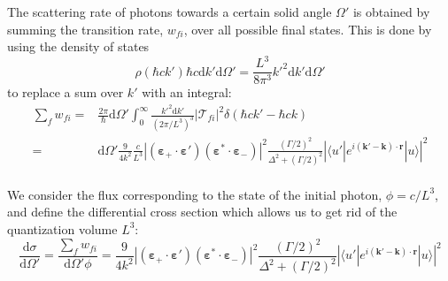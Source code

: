 \documentclass[11pt,letter]{article}
\newcommand{\bv}[1]{\ensuremath{\bm{#1}}}
\begin{document}
The scattering rate of photons towards a certain solid angle $\Omega'$ is
obtained by summing the transition rate, $w_{fi}$, over all possible final
states.    This is done by using the density of states  
\begin{equation}
    \rho( \hbar c k') \hbar c \mathrm{d} k' \mathrm{d} \Omega ' 
  = \frac{L^{3}}{8 \pi^{3} }  k'^{2} \mathrm{d} k' \mathrm{d} \Omega' 
\end{equation}
to replace a sum over $k'$ with an integral:  
\begin{equation}
\begin{split}
  \sum_{f} w_{fi} = & 
   \frac{2\pi}{\hbar}  \mathrm{d} \Omega' 
      \int_{0}^{\infty} \frac{k'^{2} \mathrm{d} k' }{ (2\pi / L^{3} ) ^{3} } 
   | \mathcal{T}_{fi} |^{2} 
   \delta( \hbar c k' - \hbar c k )  \\ 
   = & 
   \mathrm{d} \Omega' \frac{9}{4 k^{2}} \frac{ c } {L^{3} }
        |(\bv{\varepsilon}_{+}\cdot \bv{\varepsilon}' )
                       (\bv{\varepsilon}^{*}\cdot \bv{\varepsilon}_{-} ) |^{2}
    \frac{ (\Gamma/2)^{2}  }
        { \Delta^{2} +  (\Gamma/2 )^{2} }
    \left|
      \langle u' | e^{i(\bv{k}'-\bv{k}) \cdot\bv{r}} | u  \rangle
\right| ^{2} \\ 
\end{split} 
\end{equation}

We consider the flux corresponding to the state of the initial photon, $\phi =
c/L^{3}$, and define the differential cross section which allows us to get rid
of the quantization volume $L^{3}$:
\begin{equation}
 \frac{ \mathrm{d} \sigma } { \mathrm{d} \Omega'} =  
    \frac{\sum_{f} w_{fi} } { \mathrm{d} \Omega' \phi} = 
    \frac{9}{4 k^{2}} 
        |(\bv{\varepsilon}_{+}\cdot \bv{\varepsilon}' )
                       (\bv{\varepsilon}^{*}\cdot \bv{\varepsilon}_{-} ) |^{2}
    \frac{ (\Gamma/2)^{2}  }
        { \Delta^{2} +  (\Gamma/2 )^{2} }
    \left|
      \langle u' | e^{i(\bv{k}'-\bv{k}) \cdot\bv{r}} | u  \rangle
\right| ^{2}  
\end{equation}
\end{document}

